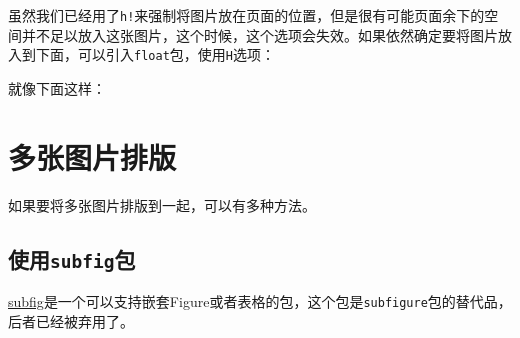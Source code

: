 \documentclass[12pt]{article}
\begin{document}
虽然我们已经用了\texttt{h!}来强制将图片放在页面的位置，但是很有可能页面余下的空间并不足以放入这张图片，这个时候，这个选项会失效。如果依然确定要将图片放入到下面，可以引入\texttt{float}包，使用\texttt{H}选项：

\begin{Shaded}
\begin{Highlighting}[]
\NormalTok{\{}\NormalTok{\}}

\NormalTok{\{}\NormalTok{\}[H]}
\end{Highlighting}
\end{Shaded}

就像下面这样：

\section{多张图片排版}\label{ux591aux5f20ux56feux7247ux6392ux7248}

如果要将多张图片排版到一起，可以有多种方法。

\subsection{\texorpdfstring{使用\texttt{subfig}包}{使用subfig包}}\label{ux4f7fux7528subfigux5305}

\href{https://ctan.org/pkg/subfig}{subfig}是一个可以支持嵌套Figure或者表格的包，这个包是\texttt{subfigure}包的替代品，后者已经被弃用了。

\begin{Shaded}
\begin{Highlighting}[]
\NormalTok{\{}\NormalTok{\}}

\NormalTok{\{}\NormalTok{\}}
    \NormalTok{[信息锅]\{}
        \NormalTok{[width=0.4}\NormalTok{, height=80pt]\{}\NormalTok{\}}
\NormalTok{    \}}
    \NormalTok{[硬气功]\{}
        \NormalTok{[width=0.4}\NormalTok{, height=80pt]\{}\NormalTok{\}}
\NormalTok{    \}}
    \NormalTok{\{}\NormalTok{\}}
\NormalTok{\{}\NormalTok{\}}
\end{Highlighting}
\end{Shaded}
\end{document}
